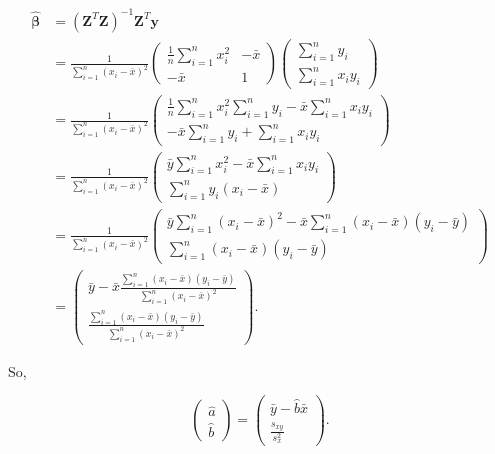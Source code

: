 \documentclass[
]{book}
\begin{document}
\begin{align*}
\mathbf{\hat{\beta}} &= \left( \mathbf{Z}^T\mathbf{Z} \right) ^{-1}\mathbf{Z}^T\mathbf{y} \\[5pt]
&= \frac{1}{\sum\limits_{i=1}^n (x_i-\bar{x})^2} \begin{pmatrix} \frac{1}{n} \sum\limits_{i=1}^{n} x_i^2 & -\bar{x} \\ -\bar{x} & 1 \end{pmatrix} \begin{pmatrix} \sum\limits_{i=1}^n y_i \\ \sum\limits_{i=1}^n x_iy_i \end{pmatrix} \\[5pt]
&= \frac{1}{\sum\limits_{i=1}^{n} (x_i - \bar{x})^2} \begin{pmatrix} \frac{1}{n} \sum\limits_{i=1}^{n} x_i^2 \sum\limits_{i=1}^{n} y_i - \bar{x} \sum\limits_{i=1}^{n} x_i y_i \\ -\bar{x} \sum\limits_{i=1}^{n} y_i + \sum\limits_{i=1}^{n} x_i y_i \end{pmatrix} \\[5pt]
&= \frac{1}{\sum\limits_{i=1}^{n} (x_i - \bar{x})^2} \begin{pmatrix} \bar{y} \sum\limits_{i=1}^{n} x_i^2 - \bar{x} \sum\limits_{i=1}^{n} x_i y_i \\ \sum\limits_{i=1}^{n} y_i (x_i - \bar{x}) \end{pmatrix} \\[5pt]
&= \frac{1}{\sum\limits_{i=1}^{n} (x_i - \bar{x})^2} \begin{pmatrix} \bar{y} \sum\limits_{i=1}^{n} (x_i - \bar{x})^2 - \bar{x} \sum\limits_{i=1}^{n} (x_i - \bar{x})(y_i - \bar{y}) \\ \sum\limits_{i=1}^{n} (x_i - \bar{x})(y_i - \bar{y}) \end{pmatrix} \\[5pt]
&= \begin{pmatrix} \bar{y} - \bar{x} \frac{ \sum\limits_{i=1}^n (x_i - \bar{x})(y_i - \bar{y}) }{ \sum\limits_{i=1}^n (x_i - \bar{x})^2 } \\ \frac{ \sum\limits_{i=1}^n (x_i - \bar{x})(y_i - \bar{y}) }{ \sum\limits_{i=1}^n (x_i - \bar{x})^2 } \end{pmatrix}.
\end{align*}

So,

\[\begin{pmatrix} \hat{a} \\ \hat{b} \end{pmatrix} = \begin{pmatrix} \bar{y} - \hat{b} \bar{x} \\ \frac{s_{xy}}{s_x^2} \end{pmatrix}.\]
\end{document}
